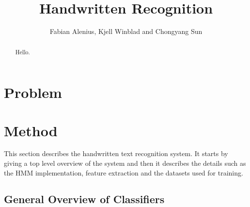 \documentclass[11pt]{article}
\author{Fabian Alenius, Kjell Winblad and Chongyang Sun} \title{Handwritten Recognition}
\begin{document}
\maketitle

\begin{abstract}
Hello.

\end{abstract}





\section{Problem}\label{sec:problem}

\section{Method}\label{sec:method}

This section describes the handwritten text recognition system. It starts by giving a top level overview of the system and then it describes the details such as the HMM implementation, feature extraction and the datasets used for training. 


\subsection{General Overview of Classifiers}\label{sec:overview_of_classifiers}



\end{document}
